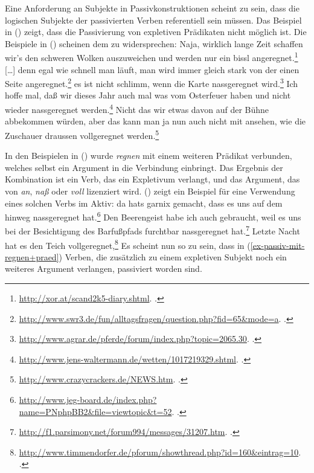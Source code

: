 Eine Anforderung an Subjekte in Passivkonstruktionen scheint zu sein, dass
die logischen Subjekte der passivierten Verben referentiell sein müssen. Das Beispiel
in () zeigt, dass die Passivierung von expletiven Prädikaten nicht
möglich ist.
\z
Die Beispiele in () scheinen dem zu widersprechen:
\eal\label{ex-passiv-mit-regnen+praed}
\ex Naja, wirklich lange Zeit schaffen wir's den schweren Wolken auszuweichen und
werden nur ein bissl angeregnet.\footnote{
\url{http://xor.at/scand2k5-diary.shtml}. .
}
\ex {}[\ldots] denn egal wie schnell man läuft, man wird immer gleich
stark von der einen Seite angeregnet.\footnote{
  \url{http://www.swr3.de/fun/alltagsfragen/question.php?fid=65&mode=a}. .
}
\ex es ist nicht schlimm, wenn die Karte nassgeregnet wird.\footnote{
\url{http://www.agrar.de/pferde/forum/index.php?topic=2065.30}. .%
}
\ex Ich hoffe mal, daß wir dieses Jahr auch mal was vom Osterfeuer haben und nicht wieder nassgeregnet werden.\footnote{
  \url{http://www.jens-waltermann.de/wetten/1017219329.shtml}. .
}
\ex Nicht das wir etwas davon auf der Bühne abbekommen würden, 
    aber das kann man ja nun auch nicht mit ansehen, wie die Zuschauer draussen vollgeregnet werden.\footnote{
\url{http://www.crazycrackers.de/NEWS.htm}. .
}

\zl
In den Beispielen in () wurde \emph{regnen} mit einem weiteren Prädikat verbunden, welches
selbst ein Argument in die Verbindung einbringt. Das Ergebnis der Kombination ist ein Verb,
das ein Expletivum verlangt, und das Argument, das von \emph{an}, \emph{naß} oder \emph{voll}
lizenziert wird. () zeigt ein Beispiel für eine Verwendung eines solchen Verbs im Aktiv:
\eal
\ex da hats garnix gemacht, dass es uns auf dem hinweg nassgeregnet hat.\footnote{
 \url{http://www.jeg-board.de/index.php?name=PNphpBB2&file=viewtopic&t=52}. .%
}
\ex Den Beerengeist habe ich auch gebraucht, weil es uns bei der Besichtigung des Barfußpfads furchtbar nassgeregnet hat.\footnote{
 \url{http://f1.parsimony.net/forum994/messages/31207.htm}. .%
}
\ex Letzte Nacht hat es den Teich vollgeregnet,\footnote{%
\url{http://www.timmendorfer.de/pforum/showthread.php?id=160&eintrag=10}. .%
}
\zl
Es scheint nun so zu sein, dass in (\ref{ex-passiv-mit-regnen+praed}) Verben, die zusätzlich zu einem expletiven Subjekt noch
ein weiteres Argument verlangen, passiviert worden sind.

